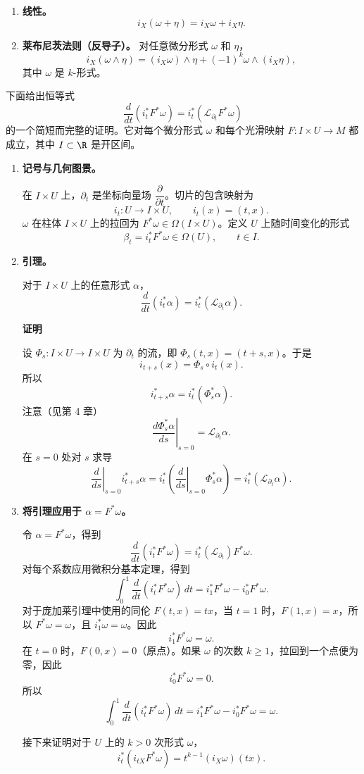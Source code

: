\begin{enumerate}
\item \textbf{线性。}
\[
  i_X(\omega+\eta)=i_X\omega+i_X\eta.
\]
\item \textbf{莱布尼茨法则（反导子）。} 对任意微分形式 $\omega$ 和 $\eta$，
\[
  i_X(\omega\wedge\eta)=(i_X\omega)\wedge\eta+(-1)^k\omega\wedge(i_X\eta),
\]
其中 $\omega$ 是 $k$-形式。
\end{enumerate}

下面给出恒等式
\[
  \frac{d}{dt}(i_t^*F^*\omega)=i_t^*(\mathcal L_{\partial_t}F^*\omega)
\]
的一个简短而完整的证明。它对每个微分形式 $\omega$ 和每个光滑映射 $F\colon I\times U\to M$ 都成立，其中 $I\subset\R$ 是开区间。

\begin{enumerate}
\item \textbf{记号与几何图景。}

在 $I\times U$ 上，$\partial_t$ 是坐标向量场 $\dfrac{\partial}{\partial t}$。切片的包含映射为
\[
  i_t\colon U\to I\times U,\qquad i_t(x)=(t,x).
\]
$\omega$ 在柱体 $I\times U$ 上的拉回为 $F^*\omega\in\Omega(I\times U)$。定义 $U$ 上随时间变化的形式
\[
  \beta_t=i_t^*F^*\omega\in\Omega(U),\qquad t\in I.
\]

\item \textbf{引理。}

对于 $I\times U$ 上的任意形式 $\alpha$，
\[
  \frac{d}{dt}(i_t^*\alpha)=i_t^*(\mathcal L_{\partial_t}\alpha).
\]

\noindent\textbf{证明}\par
设 $\Phi_s\colon I\times U\to I\times U$ 为 $\partial_t$ 的流，即 $\Phi_s(t,x)=(t+s,x)$。于是
\[
  i_{t+s}(x)=\Phi_s\circ i_t(x).
\]
所以
\[
  i_{t+s}^*\alpha=i_t^*(\Phi_s^*\alpha).
\]
注意（见第 4 章）
\[
  \left.\frac{d\Phi_s^*\alpha}{ds}\right|_{s=0}=\mathcal L_{\partial_t}\alpha.
\]
在 $s=0$ 处对 $s$ 求导
\[
  \left.\frac{d}{ds}\right|_{s=0}i_{t+s}^*\alpha
   =i_t^*\!\left(\left.\frac{d}{ds}\right|_{s=0}\Phi_s^*\alpha\right)
   =i_t^*(\mathcal L_{\partial_t}\alpha).
\]

\item \textbf{将引理应用于 $\alpha=F^*\omega$。}

令 $\alpha=F^*\omega$，得到
\[
  \frac{d}{dt}(i_t^*F^*\omega)=i_t^*(\mathcal L_{\partial_t})F^*\omega.
\]
对每个系数应用微积分基本定理，得到
\[
  \int_0^1\frac{d}{dt}(i_t^*F^*\omega)\,dt=i_1^*F^*\omega-i_0^*F^*\omega.
\]
对于庞加莱引理中使用的同伦 $F(t,x)=tx$，当 $t=1$ 时，$F(1,x)=x$，所以 $F^*\omega=\omega$，且 $i_1^*\omega=\omega$。因此%
%
\[
  i_1^*F^*\omega=\omega.
\]
在 $t=0$ 时，$F(0,x)=0$（原点）。如果 $\omega$ 的次数 $k\geq1$，拉回到一个点便为零，因此
\[
  i_0^*F^*\omega=0.
\]
所以
\[
  \int_0^1\frac{d}{dt}(i_t^*F^*\omega)\,dt
   =i_1^*F^*\omega-i_0^*F^*\omega=\omega.
\]

接下来证明对于 $U$ 上的 $k>0$ 次形式 $\omega$，
\[
  i_t^*(i_{tX}F^*\omega)=t^{k-1}(i_X\omega)(tx).
\]
\end{enumerate}

